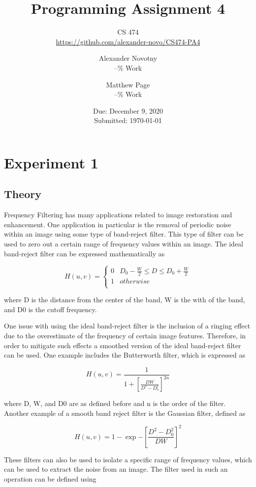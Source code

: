 \documentclass[headings=optiontoheadandtoc,listof=totoc,parskip=full]{scrartcl}
\title{Programming Assignment 4}
\subtitle{CS 474\\\url{https://github.com/alexander-novo/CS474-PA4}}
\author{Alexander Novotny\\--\% Work\\ \and Matthew Page\\--\% Work\\}
\date{Due: December 9, 2020 \\ Submitted: \today}
\begin{document}
\maketitle
\tableofcontents
{}

\newpage
{}

\section{Experiment 1}
\label{sec:exp-1}

\subsection{Theory}

Frequency Filtering has many applications related to image restoration and enhancement. One application in particular is the removal of periodic noise within an image using some type of band-reject filter. This type of filter can be used to zero out a certain range of frequency values within an image. The ideal band-reject filter can be expressed mathematically as

\[
	H(u,v) = 	\begin{cases} 
      				0 & D_0-\frac{W}{2} \leq D \leq D_0+\frac{W}{2} \\
      				1 & otherwise \\
   				\end{cases}
\]

where D is the distance from the center of the band, W is the with of the band, and D0 is the cutoff frequency.

One issue with using the ideal band-reject filter is the inclusion of a ringing effect due to the overestimate of the frequency of certain image features. Therefore, in order to mitigate such effects a smoothed version of the ideal band-reject filter can be used. One example includes the Butterworth filter, which is expressed as 

\[
	H(u,v) = \frac{1}{1+[\frac{DW}{D^2-D_0^2}]^{2n}}
\]

where D, W, and D0 are as defined before and n is the order of the filter. Another example of a smooth band reject filter is the Gaussian filter, defined as

\[
	H(u,v) = 1-\exp{-[\frac{D^2-D_0^2}{DW}]^2}
\]

These filters can also be used to isolate a specific range of frequency values, which can be used to extract the noise from an image. The filter used in such an operation can be defined using
\end{document}
